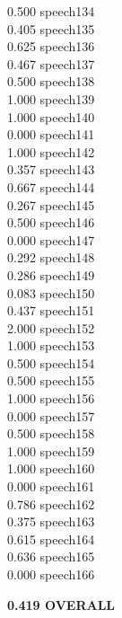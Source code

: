 \documentclass[10pt]{article}
\begin{document}
\begin{enumerate}
\begin{enumerate}
\begin{multicols}{5}
            0.500 speech134\\
            0.405 speech135\\
            0.625 speech136\\
            0.467 speech137\\
            0.500 speech138\\
            1.000 speech139\\
            1.000 speech140\\
            0.000 speech141\\
            1.000 speech142\\
            0.357 speech143\\
            0.667 speech144\\
            0.267 speech145\\
            0.500 speech146\\
            0.000 speech147\\
            0.292 speech148\\
            0.286 speech149\\
            0.083 speech150\\
            0.437 speech151\\
            2.000 speech152\\
            1.000 speech153\\
            0.500 speech154\\
            0.500 speech155\\
            1.000 speech156\\
            0.000 speech157\\
            0.500 speech158\\
            1.000 speech159\\
            1.000 speech160\\
            0.000 speech161\\
            0.786 speech162\\
            0.375 speech163\\
            0.615 speech164\\
            0.636 speech165\\
            0.000 speech166\\
            \end{multicols}
            \textbf{0.419 OVERALL}\\
            

\end{enumerate}
\end{enumerate}
\end{document}

